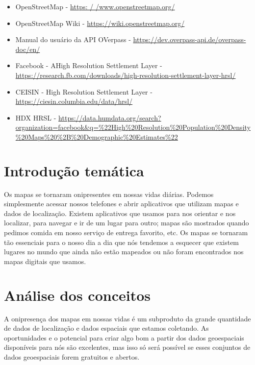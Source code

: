 \documentclass[
]{book}
\providecommand{\tightlist}{%
  \setlength{\itemsep}{0pt}\setlength{\parskip}{0pt}}
\begin{document}
\begin{itemize}
\tightlist
\item
  OpenStreetMap - \href{https://www.openstreetmap.org/}{https: / /www.openstreetmap.org/}
\item
  OpenStreetMap Wiki - \url{https://wiki.openstreetmap.org/}
\item
  Manual do usuário da API OVerpass - \url{https://dev.overpass-api.de/overpass-doc/en/}
\item
  Facebook - AHigh Resolution Settlement Layer - \url{https://research.fb.com/downloads/high-resolution-settlement-layer-hrsl/}
\item
  CEISIN - High Resolution Settlement Layer - \url{https://ciesin.columbia.edu/data/hrsl/}
\item
  HDX HRSL - \href{https://dados.humdata.org/search?organization=facebook\&q=\%22High\%20Resolution\%20Population\%20Density\%20Maps\%20\%2B\%20Demographic\%20Estimates\%22}{https://data.humdata.org/search?organization=facebook\&q=\%22High\%20Resolution\%20Population\%20Density\%20Maps\%20\%2B\%20Demographic\%20Estimates\%22}
\end{itemize}

\hypertarget{introduuxe7uxe3o-temuxe1tica-3}{%
\section{Introdução temática}\label{introduuxe7uxe3o-temuxe1tica-3}}

Os mapas se tornaram onipresentes em nossas vidas diárias. Podemos simplesmente acessar nossos telefones e abrir aplicativos que utilizam mapas e dados de localização. Existem aplicativos que usamos para nos orientar e nos localizar, para navegar e ir de um lugar para outro; mapas são mostrados quando pedimos comida em nosso serviço de entrega favorito, etc. Os mapas se tornaram tão essenciais para o nosso dia a dia que nós tendemos a esquecer que existem lugares no mundo que ainda não estão mapeados ou não foram encontrados nos mapas digitais que usamos.

\hypertarget{anuxe1lise-dos-conceitos}{%
\section{Análise dos conceitos}\label{anuxe1lise-dos-conceitos}}

A onipresença dos mapas em nossas vidas é um subproduto da grande quantidade de dados de localização e dados espaciais que estamos coletando. As oportunidades e o potencial para criar algo bom a partir dos dados geoespaciais disponíveis para nós são excelentes, mas isso só será possível se esses conjuntos de dados geoespaciais forem gratuitos e abertos.
\end{document}
